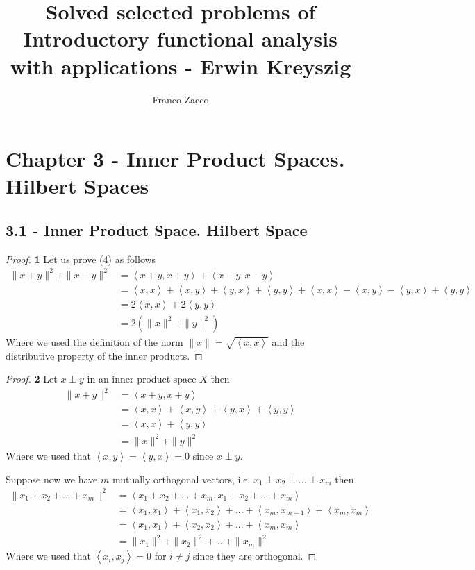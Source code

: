 \documentclass[11pt]{article}
\title{\textbf{Solved selected problems of Introductory functional analysis with applications - Erwin Kreyszig}}
\author{Franco Zacco}
\date{}
\newcommand{\inprd}[1]{\left\langle{#1}\right\rangle}
\theoremstyle{definition}
\begin{document}
\maketitle
\thispagestyle{empty}

\section*{Chapter 3 - Inner Product Spaces. Hilbert Spaces}
\subsection*{3.1 - Inner Product Space. Hilbert Space}
\begin{proof}{\textbf{1}}
Let us prove (4) as follows
\begin{align*}
    \|x+y\|^2 + \|x-y\|^2 &= \inprd{x+y, x+y} + \inprd{x-y, x-y}\\
    &=\inprd{x, x} + \inprd{x, y} + \inprd{y, x} + \inprd{y, y}
    + \inprd{x, x} - \inprd{x, y} - \inprd{y, x} + \inprd{y, y}\\
    &=2\inprd{x, x} + 2\inprd{y, y}\\
    &=2(\|x\|^2 + \|y\|^2)
\end{align*}
Where we used the definition of the norm $\|x\| = \sqrt{\inprd{x,x}}$ and
the distributive property of the inner products.
\end{proof}
\begin{proof}{\textbf{2}}
Let $x \perp y$ in an inner product space $X$ then
\begin{align*}
    \|x + y\|^2 &= \inprd{x+y, x+y}\\
    &= \inprd{x, x} + \inprd{x,y} + \inprd{y,x} + \inprd{y,y}\\
    &= \inprd{x, x} + \inprd{y, y}\\
    &= \|x\|^2 + \|y\|^2
\end{align*}
Where we used that $\inprd{x,y} = \inprd{y,x} = 0$ since $x \perp y$.

Suppose now we have $m$ mutually orthogonal vectors, i.e.
$x_1 \perp x_2 \perp ... \perp x_m$ then
\begin{align*}
    \|x_1 + x_2 + ... + x_m\|^2 &= \inprd{x_1 + x_2 + ... + x_m, x_1 + x_2 + ... + x_m}\\
    &= \inprd{x_1, x_1} + \inprd{x_1,x_2} +  ...  +\inprd{x_m,x_{m-1}} + \inprd{x_m,x_m}\\
    &= \inprd{x_1, x_1} + \inprd{x_2, x_2} + ... + \inprd{x_m, x_m}\\
    &= \|x_1\|^2 + \|x_2\|^2 + ... + \|x_m\|^2
\end{align*}
Where we used that $\inprd{x_i,x_j} = 0$ for $i \neq j$ since they are
orthogonal.
\end{proof}
\end{document}
